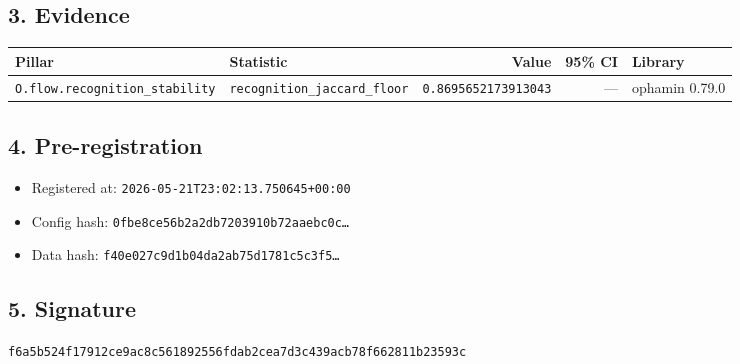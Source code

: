 \documentclass{article}
\begin{document}
\subsection*{3. Evidence}
\begin{tabular}{llrrl}\toprule
\textbf{Pillar} & \textbf{Statistic} & \textbf{Value} & \textbf{95\% CI} & \textbf{Library} \\\midrule
\texttt{O.flow.recognition\_stability} & \texttt{recognition\_jaccard\_floor} & \texttt{0.8695652173913043} & --- & ophamin 0.79.0 \\
\bottomrule\end{tabular}
\subsection*{4. Pre-registration}
\begin{itemize}
\item Registered at: \texttt{2026-05-21T23:02:13.750645+00:00}
\item Config hash: \texttt{0fbe8ce56b2a2db7203910b72aaebc0c\dots}
\item Data hash: \texttt{f40e027c9d1b04da2ab75d1781c5c3f5\dots}
\end{itemize}
\subsection*{5. Signature}
\texttt{f6a5b524f17912ce9ac8c561892556fdab2cea7d3c439acb78f662811b23593c}\\
\end{document}
